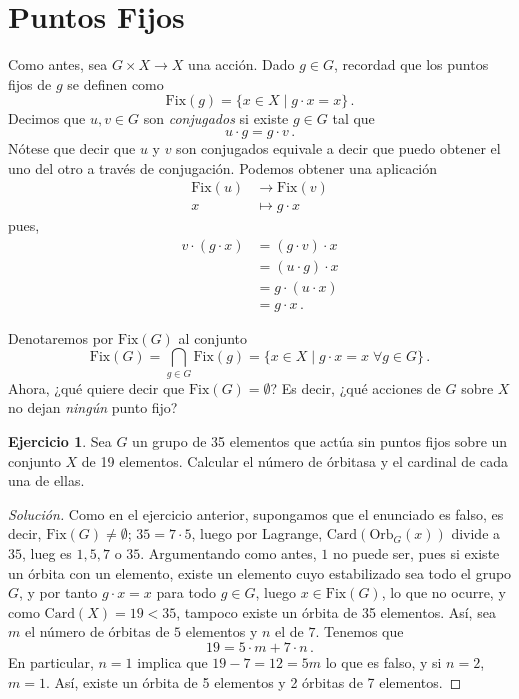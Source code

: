 \documentclass[a4paper,11pt]{amsart}
\theoremstyle{plain}
\theoremstyle{definition}
\newtheorem{ejercicio}[thm]{Ejercicio}
\theoremstyle{remark}
\newenvironment{solution}
  {\begin{proof}[Solución]}
  {\end{proof}}
\begin{document}
\section{Puntos Fijos}

Como antes, sea $G \times X \to X$ una acción. Dado $g \in G$, recordad que los puntos fijos de $g$ se definen como 
\[ \text{Fix}(g) = \{ x \in X \mid g \cdot x = x \} \,. \]
Decimos que $u, v \in G$ son \textit{conjugados} si existe $g \in G$ tal que 
\[ u \cdot g = g \cdot v \, . \]
Nótese que decir que $u$ y $v$ son conjugados equivale a decir que puedo obtener el uno del otro a través de conjugación. Podemos obtener una aplicación 
\begin{align*}
    \text{Fix}(u) &\to \text{Fix}(v)\\
    x & \mapsto g \cdot x
\end{align*}
pues, 
\begin{align*}
v \cdot (g \cdot x) & = (g \cdot v) \cdot x \\
                    & = (u \cdot g) \cdot x \\
                    & = g \cdot (u \cdot x) \\
                    & = g \cdot x \, .
\end{align*}

Denotaremos por $\text{Fix}(G)$ al conjunto 
\[ \text{Fix}(G) = \bigcap_{g \in G} \text{Fix}(g) = \{ x \in X \mid g \cdot x = x \; \forall g \in G \} \, . \]
Ahora, ¿qué quiere decir que $\text{Fix}(G) = \emptyset$? Es decir, ¿qué acciones de $G$ sobre $X$ no dejan \textit{ningún} punto fijo? 

\begin{ejercicio}
Sea $G$ un grupo de 35 elementos que actúa sin puntos fijos sobre un conjunto $X$ de 19 elementos. Calcular el número de órbitasa y el cardinal de cada una de ellas. 
\end{ejercicio}

\begin{solution}
Como en el ejercicio anterior, supongamos que el enunciado es falso, es decir, $\text{Fix}(G) \neq\emptyset$; $35 = 7 \cdot 5$, luego por Lagrange, $\text{Card}(\text{Orb}_G(x))$ divide a $35$, lueg es $1, 5, 7$ o $35$. Argumentando como antes, $1$ no puede ser, pues si existe un órbita con un elemento, existe un elemento cuyo estabilizado sea todo el grupo $G$, y por tanto $g \cdot x = x$ para todo $g \in G$, luego $x \in \text{Fix}(G)$, lo que no ocurre, y como $\text{Card}(X) = 19 < 35$, tampoco existe un órbita de 35 elementos. Así, sea $m$ el número de órbitas de $5$ elementos y $n$ el de $7$. Tenemos que 
\[ 19 = 5 \cdot m + 7 \cdot n \, . \]
En particular, $n = 1$ implica que $19 - 7 = 12 = 5m$ lo que es falso, y si $n = 2$, $m = 1$. Así, existe un órbita de 5 elementos y 2 órbitas de 7 elementos. 
\end{solution}
\end{document}

